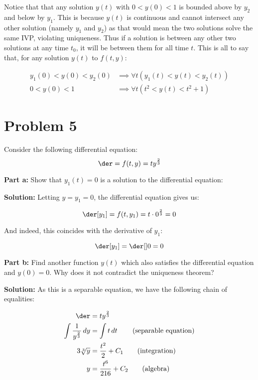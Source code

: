 \documentclass{article}
\begin{document}
Notice that that any solution $y(t)$ with $0<y(0)<1$ is bounded above by $y_2$ and below by $y_1$. This is because $y(t)$ is continuous and cannot intersect any other solution (namely $y_1$ and $y_2$) as that would mean the two solutions solve the same IVP, violating uniqueness. Thus if a solution is between any other two solutions at any time $t_0$, it will be between them for all time $t$. This is all to say that, for any solution $y(t)$ to $f(t,y)$:

\begin{align*}
    y_1(0)<y(0)<y_2(0)&\implies \forall t(y_1(t)<y(t)<y_2(t))\\
    0<y(0)<1&\implies \forall t(t^2<y(t)<t^2+1)
\end{align*}

\section*{Problem 5}
Consider the following differential equation:
\begin{equation*}
    \der=f(t,y)=ty^{\frac{2}{3}}
\end{equation*}

\noindent\textbf{Part a:} Show that $y_1(t)=0$ is a solution to the differential equation:
\bigskip

\noindent\textbf{Solution:} Letting $y=y_1=0$, the differential equation gives us:

\begin{equation*}
    \der[y_1]=f(t,y_1)=t\cdot0^{\frac{2}{3}}=0
\end{equation*}

And indeed, this coincides with the derivative of $y_1$:

\begin{equation*}
    \der[y_1]=\der[]0=0
\end{equation*}
\smallskip

\noindent\textbf{Part b:} Find another function $y(t)$ which also satisfies the differential equation and $y(0) = 0$. Why does it not contradict the uniqueness theorem?
\bigskip
\pagebreak

\noindent\textbf{Solution:} As this is a separable equation, we have the following chain of equalities:

\begin{align*}
    \der&=ty^{\frac{2}{3}}\\
    \int \frac{1}{y^{\frac{2}{3}}}\mathop{dy}&=\int t\mathop{dt}\tag{separable equation}\\
    3\sqrt[3]{y}&=\frac{t^2}{2}+C_1\tag{integration}\\
    y&=\frac{t^6}{216}+C_2\tag{algebra}\\
\end{align*}
\end{document}
